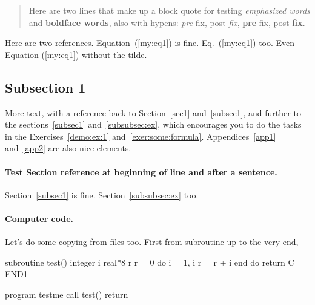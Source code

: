 \documentclass[%
oneside,                 %
final,                   %
10pt]{article}
\theoremstyle{definition}
\begin{document}
\begin{quote}
Here are two lines that make up
a block quote for testing \emph{emphasized words} and \textbf{boldface words},
also with hypens:
\emph{pre}-fix, post-\emph{fix}, \textbf{pre}-fix, post-\textbf{fix}.
\end{quote}


Here are two references. Equation~(\ref{my:eq1}) is fine. Eq.~(\ref{my:eq1}) too.
Even Equation (\ref{my:eq1}) without the tilde.

\subsection{Subsection 1}
\label{subsec1}



More text, with a reference back to
Section~\vref{sec1} and~\vref{subsec1}, and further to the
sections~\vref{subsec1} and~\vref{subsubsec:ex}, which
encourages you to do the tasks in the
Exercises~\vref{demo:ex:1} and~\vref{exer:some:formula}.
Appendices~\vref{app1} and~\vref{app2} are also nice elements.

\paragraph{Test Section reference at beginning of line and after a sentence.}
Section~\vref{subsec1} is fine.
Section~\vref{subsubsec:ex} too.


\paragraph{Computer code.}
Let's do some copying from files too. First from subroutine up to the very end,















\bfcod
      subroutine test()
      integer i
      real*8 r
      r = 0
      do i = 1, i
         r = r + i
      end do
      return
C     END1

      program testme
      call test()
      return
\end{document}
